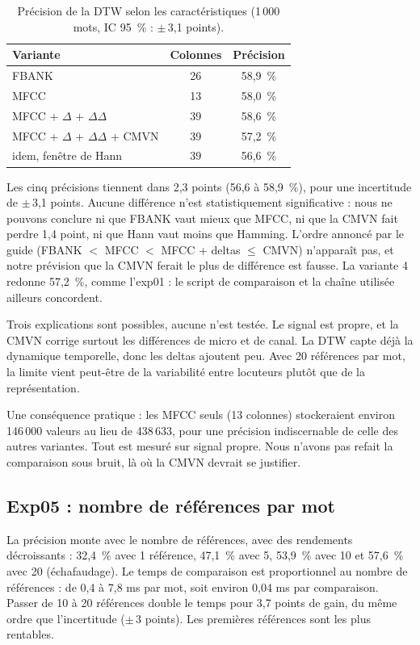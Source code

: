 \begin{table}[ht]
  \centering
  \begin{tabular}{lcc}
    \toprule
    Variante & Colonnes & Précision\\
    \midrule
    FBANK & 26 & 58,9~\%\\
    MFCC & 13 & 58,0~\%\\
    MFCC + $\Delta$ + $\Delta\Delta$ & 39 & 58,6~\%\\
    MFCC + $\Delta$ + $\Delta\Delta$ + CMVN & 39 & 57,2~\%\\
    idem, fenêtre de Hann & 39 & 56,6~\%\\
    \bottomrule
  \end{tabular}
  \caption{Précision de la DTW selon les caractéristiques (1\,000 mots, IC 95~\% : $\pm$\,3,1 points).}
\end{table}

Les cinq précisions tiennent dans 2,3 points (56,6 à 58,9~\%), pour une incertitude de $\pm$\,3,1 points. Aucune différence n'est statistiquement significative : nous ne pouvons conclure ni que FBANK vaut mieux que MFCC, ni que la CMVN fait perdre 1,4 point, ni que Hann vaut moins que Hamming. L'ordre annoncé par le guide (FBANK $<$ MFCC $<$ MFCC + deltas $\le$ CMVN) n'apparaît pas, et notre prévision que la CMVN ferait le plus de différence est fausse. La variante 4 redonne 57,2~\%, comme l'exp01 : le script de comparaison et la chaîne utilisée ailleurs concordent.

Trois explications sont possibles, aucune n'est testée. Le signal est propre, et la CMVN corrige surtout les différences de micro et de canal. La DTW capte déjà la dynamique temporelle, donc les deltas ajoutent peu. Avec 20 références par mot, la limite vient peut-être de la variabilité entre locuteurs plutôt que de la représentation.

Une conséquence pratique : les MFCC seuls (13 colonnes) stockeraient environ 146\,000 valeurs au lieu de 438\,633, pour une précision indiscernable de celle des autres variantes. Tout est mesuré sur signal propre. Nous n'avons pas refait la comparaison sous bruit, là où la CMVN devrait se justifier.

\subsection{Exp05 : nombre de références par mot}

La précision monte avec le nombre de références, avec des rendements décroissants : 32,4~\% avec 1 référence, 47,1~\% avec 5, 53,9~\% avec 10 et 57,6~\% avec 20 (échafaudage). Le temps de comparaison est proportionnel au nombre de références : de 0,4 à 7,8 ms par mot, soit environ 0,04 ms par comparaison. Passer de 10 à 20 références double le temps pour 3,7 points de gain, du même ordre que l'incertitude ($\pm$\,3 points). Les premières références sont les plus rentables.

